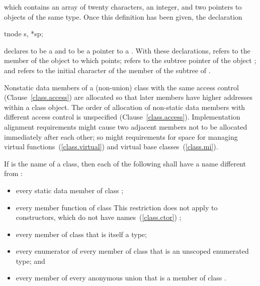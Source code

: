 which contains an array of twenty characters, an integer, and two
pointers to objects of the same type. Once this definition has been
given, the declaration

\begin{codeblock}
tnode s, *sp;
\end{codeblock}

declares  to be a  and  to be a pointer
to a . With these declarations,  refers to
the  member of the object to which  points;
 refers to the  subtree pointer of the object
; and  refers to the initial character
of the  member of the  subtree of .
\exitexample

\pnum
{}%
Nonstatic data members of a (non-union) class
with the same access control (Clause~\ref{class.access})
are allocated so that later
members have higher addresses within a class object.
%
The order of allocation of non-static data members
with different access control
is unspecified (Clause~\ref{class.access}).
Implementation alignment requirements might cause two adjacent members
not to be allocated immediately after each other; so might requirements
for space for managing virtual functions~(\ref{class.virtual}) and
virtual base classes~(\ref{class.mi}).

\pnum
If  is the name of a class, then each of the following shall
have a name different from :

\begin{itemize}
\item every static data member of class ;

\item every member function of class 
\enternote
This restriction does not apply to constructors, which do not have
names~(\ref{class.ctor})
\exitnote;

\item every member of class  that is itself a type;

\item every enumerator of every member of class  that is an
unscoped enumerated type; and

\item every member of every anonymous union that is a member of class
.
\end{itemize}

